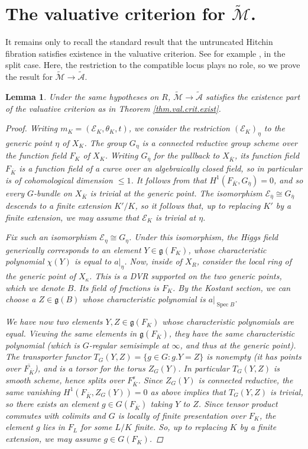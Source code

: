 \documentclass[openany]{amsbook}
\newtheorem{lemma}[theorem]{Lemma}
\theoremstyle{definition}
\theoremstyle{remark}
\numberwithin{equation}{section}
\newcommand{\cA}{\mathcal{A}}
\newcommand{\cM}{\mathcal{M}}
\newcommand{\cE}{\mathcal{E}}
\newcommand{\ol}[1]{\overline{#1}}
\renewcommand{\-}{\operatorname{-}}
\newcommand{\Spec}{\operatorname{Spec}}
\newcommand{\ctM}{\widetilde{\cM}}
\newcommand{\ctA}{\widetilde{\cA}}
\renewcommand{\fg}{\mathfrak{g}}
\begin{document}
\section{The valuative criterion for \texorpdfstring{$\ctM$.}{ctM}}

It remains only to recall the standard result that the untruncated Hitchin fibration satisfies existence in the valuative criterion. See for example \cite[Lemma 6.20]{AHLHModuliForStacks}, \cite[\S 8.4]{CLI} in the split case. Here, the restriction to the compatible locus plays no role, so we prove the result for $\ctM \to \ctA$.

\begin{lemma}\label{lem.untrunc.val.exist}
Under the same hypotheses on $R$, $\ctM \to \ctA$ satisfies the existence part of the valuative criterion as in Theorem \ref{thm.val.crit.exist}.
\begin{proof}
    Writing $m_K = (\cE_K, \theta_K, t)$, we consider the restriction $(\cE_K)_{\eta}$ to the generic point $\eta$ of $X_K$. The group $G_{\eta}$ is a connected reductive group scheme over the function field $F_K$ of $X_K$. Writing $G_{\ol{\eta}}$ for the pullback to $X_{\ol{K}}$, its function field $F_{\ol{K}}$ is a function field of a curve over an algebraically closed field, so in particular is of cohomological dimension $\le 1$. 
    It follows from \cite[III.2.3, Thm 1' and Remarks]{serregalcoh} that $H^1(F_{\ol{K}}, G_{\ol{\eta}}) = 0$, and so every $G$-bundle on $X_{\ol{K}}$ is trivial at the generic point. The isomorphism $\cE_{\ol{\eta}} \cong G_{\ol{\eta}}$ descends to a finite extension $K'/K$, so it follows that, up to replacing $K'$ by a finite extension, we may assume that $\cE_K$ is trivial at $\eta$. 
    
    Fix such an isomorphism $\cE_{\eta} \cong G_{\eta}$. Under this isomorphism, the Higgs field generically corresponds to an element $Y \in \fg(F_K)$, whose characteristic polynomial $\chi(Y)$ is equal to $a|_{\eta}$. Now, inside of $X_R$, consider the local ring of the generic point of $X_{\kappa}$. This is a DVR supported on the two generic points, which we denote $B$. Its field of fractions is $F_K$. By the Kostant section, we can choose a $Z \in \fg(B)$ whose characteristic polynomial is $a|_{\Spec B}$. 

    We have now two elements $Y,Z \in \fg(F_K)$ whose characteristic polynomials are equal. Viewing the same elements in $\fg(F_{\ol{K}})$, they have the same characteristic polynomial (which is $G$-regular semisimple at $\infty$, and thus at the generic point). The transporter functor $T_G(Y,Z) = \{g \in G : g.Y = Z\}$ is nonempty (it has points over $\ol{F_{\ol{K}}}$), and is a torsor for the torus $Z_G(Y)$. In particular $T_G(Y,Z)$ is smooth scheme, hence splits over $F_{\ol{K}}^s$. Since $Z_G(Y)$ is connected reductive, the same vanishing $H^1(F_{\ol{K}}, Z_G(Y)) = 0$ as above implies that $T_G(Y,Z)$ is trivial, so there exists an element $g \in G(F_{\ol{K}})$ taking $Y$ to $Z$. Since tensor product commutes with colimits and $G$ is locally of finite presentation over $F_K$, the element $g$ lies in $F_{L}$ for some $L/K$ finite. So, up to replacing $K$ by a finite extension, we may assume $g \in G(F_K)$. 
    

\end{proof}
\end{lemma}
\end{document}
